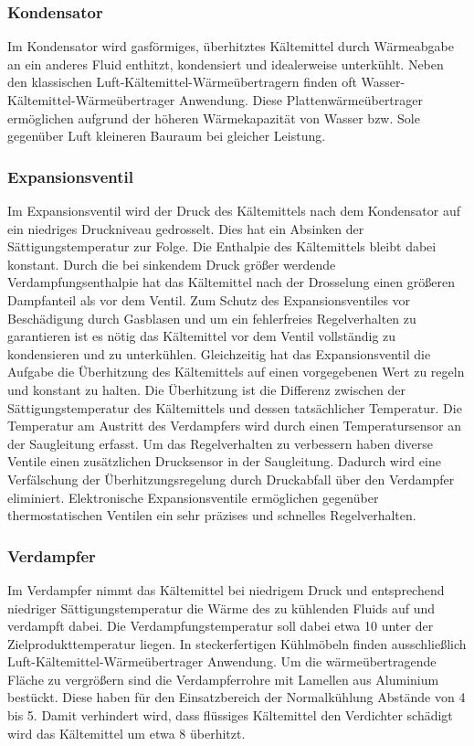 \subsubsection{Kondensator}
\label{subsubsec:Kondensator}

Im Kondensator wird gasförmiges, überhitztes Kältemittel durch Wärmeabgabe an ein anderes Fluid enthitzt, kondensiert und idealerweise unterkühlt. Neben den klassischen Luft-Kältemittel-Wärmeübertragern finden oft Wasser-Kältemittel-Wärmeübertrager Anwendung. Diese Plattenwärmeübertrager ermöglichen aufgrund der höheren Wärmekapazität von Wasser bzw. Sole gegenüber Luft kleineren Bauraum bei gleicher Leistung.

\subsubsection{Expansionsventil}
\label{subsubsec:Expansionsventil}


Im Expansionsventil wird der Druck des Kältemittels nach dem Kondensator auf ein niedriges Druckniveau gedrosselt. Dies hat ein Absinken der Sättigungstemperatur zur Folge. Die Enthalpie des Kältemittels bleibt dabei konstant. Durch die bei sinkendem Druck größer werdende Verdampfungsenthalpie hat das Kältemittel nach der Drosselung einen größeren Dampfanteil als vor dem Ventil. Zum Schutz des Expansionsventiles vor Beschädigung durch Gasblasen und um ein fehlerfreies Regelverhalten zu garantieren ist es nötig das Kältemittel vor dem Ventil vollständig zu kondensieren und zu unterkühlen. Gleichzeitig hat das Expansionsventil die Aufgabe die Überhitzung des Kältemittels auf einen vorgegebenen Wert zu regeln und konstant zu halten. Die Überhitzung ist die Differenz zwischen der Sättigungstemperatur des Kältemittels und dessen tatsächlicher Temperatur. Die Temperatur am Austritt des Verdampfers wird durch einen Temperatursensor an der Saugleitung erfasst. Um das Regelverhalten zu verbessern haben diverse Ventile einen zusätzlichen Drucksensor in der Saugleitung. Dadurch wird eine Verfälschung der Überhitzungsregelung durch Druckabfall über den Verdampfer eliminiert. Elektronische Expansionsventile ermöglichen gegenüber thermostatischen Ventilen ein sehr präzises und schnelles Regelverhalten. 

\subsubsection{Verdampfer}
\label{subsubsec:Verdampfer}

Im Verdampfer nimmt das Kältemittel bei niedrigem Druck und entsprechend niedriger Sättigungstemperatur die Wärme des zu kühlenden Fluids auf und verdampft dabei. Die Verdampfungstemperatur soll dabei etwa \unit{10}{\kelvin} unter der Zielprodukttemperatur liegen. In steckerfertigen Kühlmöbeln finden ausschließlich Luft-Kältemittel-Wärmeübertrager Anwendung. Um die wärmeübertragende Fläche zu vergrößern sind die Verdampferrohre mit Lamellen aus Aluminium bestückt. Diese haben für den Einsatzbereich der Normalkühlung Abstände von \unit{4}{\milli\metre} bis \unit{5}{\milli\metre}. Damit verhindert wird, dass flüssiges Kältemittel den Verdichter schädigt wird das Kältemittel um etwa \unit{8}{\kelvin} überhitzt.


